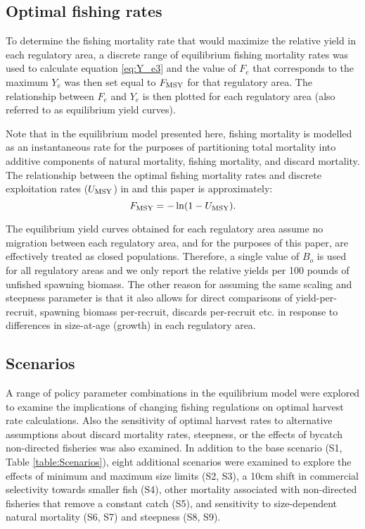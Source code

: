 \subsection*{Optimal fishing rates} %
\label{sub:optimal_fishing_rates}
To determine the fishing mortality rate that would maximize the relative yield in each regulatory area, a discrete range of equilibrium fishing mortality rates was used to calculate equation \eqref{eq:Y_e3} and the value of $F_e$ that corresponds to the maximum $Y_e$ was then set equal to $F_{\rm{MSY}}$ for that regulatory area. The relationship between $F_e$ and $Y_e$ is then plotted for each regulatory area (also referred to as equilibrium yield curves). 

Note that in the equilibrium model presented here, fishing mortality is modelled as an instantaneous rate for the purposes of partitioning total mortality  into additive components of natural mortality, fishing mortality, and discard mortality.  The relationship between the optimal fishing mortality rates and discrete exploitation rates ($U_{\rm{MSY}}$) in \cite{clark2006assessment} and this paper is approximately:
\[
F_{\rm{MSY}} = -\ln(1-U_{\rm{MSY}}).
\]

The equilibrium yield curves obtained for each regulatory area assume no migration between each regulatory area, and for the purposes of this paper, are effectively treated as closed populations.  Therefore, a single value of $B_o$ is used for all regulatory areas and we only report the relative yields per 100 pounds of unfished spawning biomass.  The other reason for assuming the same scaling and steepness parameter is that it also allows for direct  comparisons of yield-per-recruit, spawning biomass per-recruit, discards per-recruit etc. in response to differences in size-at-age (growth) in each regulatory area.


\subsection*{Scenarios} %
\label{sub:scenarios}

A range of policy parameter combinations in the equilibrium model were explored to examine the implications of changing fishing regulations on optimal harvest rate calculations.  Also the sensitivity of optimal harvest rates to alternative assumptions about discard mortality rates, steepness, or the effects of bycatch non-directed fisheries was also examined.  In addition to the base scenario (S1, Table \ref{table:Scenarios}), eight additional scenarios were examined to explore the effects of minimum and maximum size limits (S2, S3), a 10cm shift in commercial selectivity towards smaller fish (S4), other mortality associated with non-directed fisheries that remove a constant catch (S5), and sensitivity to size-dependent natural mortality (S6, S7) and steepness (S8, S9).



